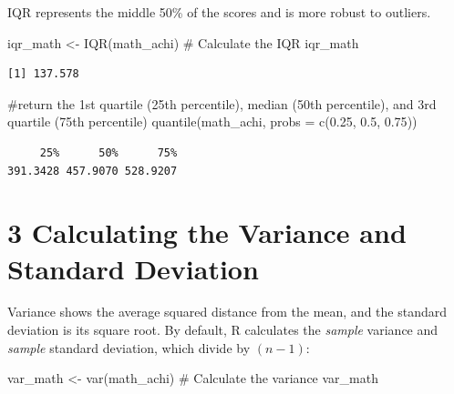\documentclass[
  letterpaper,
  DIV=11,
  numbers=noendperiod]{scrreprt}
\newenvironment{Shaded}{\begin{snugshade}}{\end{snugshade}}
\newcommand{\AttributeTok}[1]{\textcolor[rgb]{0.40,0.45,0.13}{#1}}
\newcommand{\CommentTok}[1]{\textcolor[rgb]{0.37,0.37,0.37}{#1}}
\newcommand{\FloatTok}[1]{\textcolor[rgb]{0.68,0.00,0.00}{#1}}
\newcommand{\FunctionTok}[1]{\textcolor[rgb]{0.28,0.35,0.67}{#1}}
\newcommand{\NormalTok}[1]{\textcolor[rgb]{0.00,0.23,0.31}{#1}}
\newcommand{\OtherTok}[1]{\textcolor[rgb]{0.00,0.23,0.31}{#1}}
\begin{document}

IQR represents the middle 50\% of the scores and is more robust to
outliers.

\begin{Shaded}
\begin{Highlighting}[]
\NormalTok{iqr\_math }\OtherTok{\textless{}{-}} \FunctionTok{IQR}\NormalTok{(math\_achi) }\CommentTok{\# Calculate the IQR }
\NormalTok{iqr\_math }
\end{Highlighting}
\end{Shaded}

\begin{verbatim}
[1] 137.578
\end{verbatim}

\begin{Shaded}
\begin{Highlighting}[]
\CommentTok{\#return the 1st quartile (25th percentile), median (50th percentile), and 3rd quartile (75th percentile) }
\FunctionTok{quantile}\NormalTok{(math\_achi, }\AttributeTok{probs =} \FunctionTok{c}\NormalTok{(}\FloatTok{0.25}\NormalTok{, }\FloatTok{0.5}\NormalTok{, }\FloatTok{0.75}\NormalTok{)) }
\end{Highlighting}
\end{Shaded}

\begin{verbatim}
     25%      50%      75% 
391.3428 457.9070 528.9207 
\end{verbatim}


\chapter*{3 Calculating the Variance and Standard
Deviation}\label{calculating-the-variance-and-standard-deviation}


Variance shows the average squared distance from the mean, and the
standard deviation is its square root. By default, R calculates the
\emph{sample} variance and \emph{sample} standard deviation, which
divide by \((n - 1)\):

\begin{Shaded}
\begin{Highlighting}[]
\NormalTok{var\_math }\OtherTok{\textless{}{-}} \FunctionTok{var}\NormalTok{(math\_achi) }\CommentTok{\# Calculate the variance }
\NormalTok{var\_math }
\end{Highlighting}
\end{Shaded}
\end{document}
